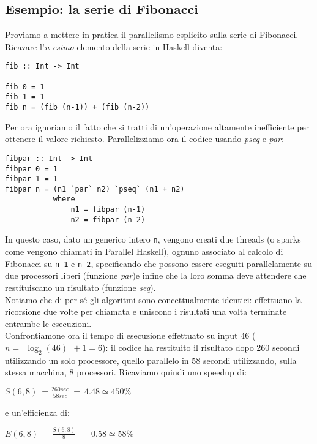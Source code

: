 \subsection{Esempio: la serie di Fibonacci}
Proviamo a mettere in pratica il parallelismo esplicito sulla serie di Fibonacci. Ricavare l'\textit{n-esimo} elemento della serie in Haskell diventa:
\begin{verbatim}
fib :: Int -> Int

fib 0 = 1
fib 1 = 1
fib n = (fib (n-1)) + (fib (n-2))
\end{verbatim}
Per ora ignoriamo il fatto che si tratti di un'operazione altamente inefficiente per ottenere il valore richiesto. Parallelizziamo ora il codice usando \textit{pseq} e \textit{par}:
\begin{verbatim}
fibpar :: Int -> Int
fibpar 0 = 1
fibpar 1 = 1
fibpar n = (n1 `par` n2) `pseq` (n1 + n2)
           where
               n1 = fibpar (n-1)
               n2 = fibpar (n-2)
\end{verbatim}
In questo caso, dato un generico intero \texttt{n}, vengono creati due threads (o sparks come vengono chiamati in Parallel Haskell), ognuno associato al calcolo di Fibonacci su \texttt{n-1} e \texttt{n-2}, specificando che possono essere eseguiti parallelamente su due processori liberi (funzione \textit{par})e infine che la loro somma deve attendere che restituiscano un risultato (funzione \textit{seq}).\\
Notiamo che  di per sé gli algoritmi sono concettualmente identici: effettuano la ricorsione due volte per chiamata e uniscono i risultati una volta terminate entrambe le esecuzioni.\\
Confrontiamone ora il tempo di esecuzione effettuato su input 46 ($n = \lfloor \log_2(46) \rfloor + 1 = 6$): il codice ha restituito il risultato dopo 260 secondi utilizzando un solo processore, quello parallelo in 58 secondi utilizzando, sulla stessa macchina, 8 processori. Ricaviamo quindi uno speedup di:
\begin{center}
$S(6,8) \ = \frac{260 sec}{58 sec} \ = \ 4.48 \simeq 450 \%$
\end{center} 
e un'efficienza di:
\begin{center}
$E(6,8) \ = \frac{S(6,8)}{8} \ = \ 0.58 \simeq 58 \%$
\end{center}
\newpage
